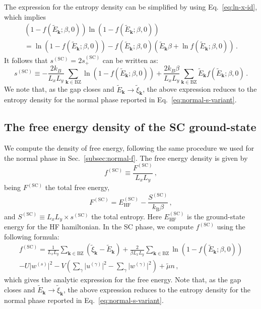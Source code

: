 The expression for the entropy density can be simplified by using Eq.~\eqref{eq:ln-x-id}, which implies
\begin{multline*}
	\left(
	1-f( \tilde{E}_\mathbf{k}; \beta,0)
	\right) \ln \left(
	1-f( \tilde{E}_\mathbf{k}; \beta,0)
	\right)\\
	= \ln \left(
	1-f( \tilde{E}_\mathbf{k}; \beta,0)
	\right) 
	-f( \tilde{E}_\mathbf{k}; \beta,0)
	\left(
	\tilde{E}_\mathbf{k}\beta + \ln  f( \tilde{E}_\mathbf{k}; \beta,0)
	\right) \, .
\end{multline*}
It follows that $s^{(\mathrm{SC})}=2s_+^{(\mathrm{SC})}$ can be written as:
\begin{equation}\label{eq:sc-s-variant}
	s^{(\mathrm{SC})} \equiv -\frac{2 k_B}{L_x L_y} \sum_{\mathbf{k}\in\mathrm{BZ}} \ln \left(
	1- f( \tilde{E}_\mathbf{k}; \beta,0)
	\right) 
	+ \frac{2 k_B \beta}{L_x L_y} \sum_{\mathbf{k}\in\mathrm{BZ}} \tilde{E}_\mathbf{k} f( \tilde{E}_\mathbf{k}; \beta,0) \, .
\end{equation}
We note that, as the gap closes and $\tilde{E}_\mathbf{k} \to \tilde{\xi}_\mathbf{k}$, the above expression reduces to the entropy density for the normal phase reported in Eq.~\eqref{eq:normal-s-variant}.

\subsection{The free energy density of the SC ground-state}\label{subsec:sc-f}

We compute the density of free energy, following the same procedure we used for the normal phase in Sec.~\ref{subsec:normal-f}. The free energy density is given by
\begin{equation}\label{eq:sc-fMFT-def}
	f^{(\mathrm{SC})} \equiv \frac{F^{(\mathrm{SC})}}{L_x L_y} \, ,
\end{equation}
being $F^{(\mathrm{SC})}$ the total free energy,
\begin{equation}\label{eq:sc-FMFT-def}
	F^{(\mathrm{SC})} = E_\mathrm{HF}^{(\mathrm{SC})} - \frac{S^{(\mathrm{SC})}}{k_\mathrm{B} \beta} \, ,
\end{equation}
and $S^{(\mathrm{SC})} \equiv  L_x L_y \times s^{(\mathrm{SC})}$ the total entropy. Here $E_\mathrm{HF}^{(\mathrm{SC})}$ is the ground-state energy for the HF hamiltonian. In the SC phase, we compute $f^{(\mathrm{SC})}$ using the following formula:
\begin{multline}
	f^{(\mathrm{SC})} = \frac{1}{L_x L_y} \sum_{\mathbf{k} \in \mathrm{BZ}} \left(
	\tilde{\xi}_\mathbf{k} - \tilde{E}_\mathbf{k}
	\right) + \frac{2}{\beta L_x L_y} \sum_{\mathbf{k}\in\mathrm{BZ}} \ln \left(
	1- f( \tilde{E}_\mathbf{k}; \beta,0) 
	\right) \\
	-U \big|
	w^{(s)}
	\big|^2 - V \left(
	\sum_\gamma \big|
	u^{(\gamma)}
	\big|^2 - \sum_\gamma \big|
	w^{(\gamma)}
	\big|^2
	\right) + \tilde{\mu} n \, ,
	\label{eq:sc-fMFT}
\end{multline}
which gives the analytic expression for the free energy. Note that, as the gap closes and $\tilde{E}_\mathbf{k} \to \tilde{\xi}_\mathbf{k}$, the above expression reduces to the entropy density for the normal phase reported in Eq.~\eqref{eq:normal-s-variant}.


